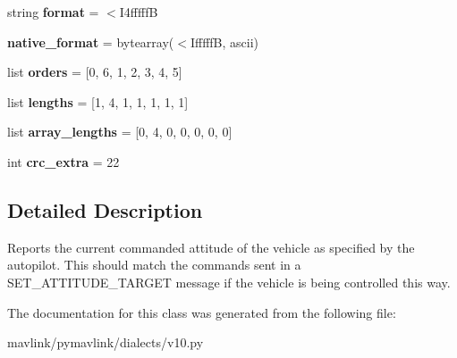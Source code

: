 \begin{DoxyCompactItemize}
string {\bfseries format} = \textquotesingle{}$<$I4fffffB\textquotesingle{}
\item 
\mbox{\label{classpymavlink_1_1dialects_1_1v10_1_1MAVLink__attitude__target__message_a592c48447f46d98b76e123219e4c1777}} 
{\bfseries native\+\_\+format} = bytearray(\textquotesingle{}$<$IfffffB\textquotesingle{}, \textquotesingle{}ascii\textquotesingle{})
\item 
\mbox{\label{classpymavlink_1_1dialects_1_1v10_1_1MAVLink__attitude__target__message_a4b88225f2cd3fa1e5e8c43f3c3e8157f}} 
list {\bfseries orders} = \mbox{[}0, 6, 1, 2, 3, 4, 5\mbox{]}
\item 
\mbox{\label{classpymavlink_1_1dialects_1_1v10_1_1MAVLink__attitude__target__message_a1c7e7793c3d94aef5a6a43c2732873e7}} 
list {\bfseries lengths} = \mbox{[}1, 4, 1, 1, 1, 1, 1\mbox{]}
\item 
\mbox{\label{classpymavlink_1_1dialects_1_1v10_1_1MAVLink__attitude__target__message_aa9179021aac6e9d6226eb1b1d2e1687d}} 
list {\bfseries array\+\_\+lengths} = \mbox{[}0, 4, 0, 0, 0, 0, 0\mbox{]}
\item 
\mbox{\label{classpymavlink_1_1dialects_1_1v10_1_1MAVLink__attitude__target__message_a147759ab558362163b59b7cf41e272b2}} 
int {\bfseries crc\+\_\+extra} = 22
\end{DoxyCompactItemize}


\subsection{Detailed Description}
\begin{DoxyVerb}Reports the current commanded attitude of the vehicle as
specified by the autopilot. This should match the commands
sent in a SET_ATTITUDE_TARGET message if the vehicle is being
controlled this way.
\end{DoxyVerb}
 

The documentation for this class was generated from the following file\+:\begin{DoxyCompactItemize}
\item 
mavlink/pymavlink/dialects/v10.\+py\end{DoxyCompactItemize}
